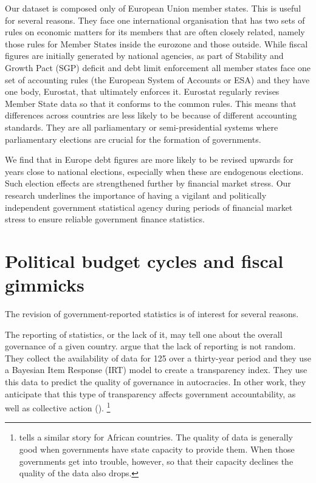 \documentclass[]{article}
\begin{document}
Our dataset is composed only of European Union member states. This is useful for several reasons. They face one international organisation that has two sets of rules on economic matters for its members that are often closely related, namely those rules for Member States inside the eurozone and those outside. While fiscal figures are initially generated by national agencies, as part of Stability and Growth Pact (SGP) deficit and debt limit enforcement all member states face one set of accounting rules (the European System of Accounts or ESA) and they have one body, Eurostat, that ultimately enforces it. Eurostat regularly revises Member State data so that it conforms to the common rules. This means that differences across countries are less likely to be because of different accounting standards. They are all parliamentary or semi-presidential systems where parliamentary elections are crucial for the formation of governments.

We find that in Europe debt figures are more likely to be revised upwards for years close to national elections, especially when these are endogenous elections. Such election effects are strengthened further by financial market stress. Our research underlines the importance of having a vigilant and politically independent government statistical agency during periods of financial market stress to ensure reliable government finance statistics.

\section{Political budget cycles and fiscal gimmicks}

The revision of government-reported statistics is of interest for several reasons.

The reporting of statistics, or the lack of it, may tell one about the overall governance of a given country. \cite{Hollyer2014} argue that the lack of reporting is not random. They collect the availability of data for 125 over a thirty-year period and they use a Bayesian Item Response  (IRT) model to create a transparency index.  They use this data to predict the quality of governance in autocracies. In other work, they anticipate that this type of transparency affects government accountability, as well as collective action (\cite{hollyerforthcoming}). \footnote{\cite{jervin2013} tells a similar story for African countries. The quality of data is generally good when governments have state capacity to provide them. When those governments get into trouble, however, so that their capacity declines the quality of the data also drops.}
\end{document}
